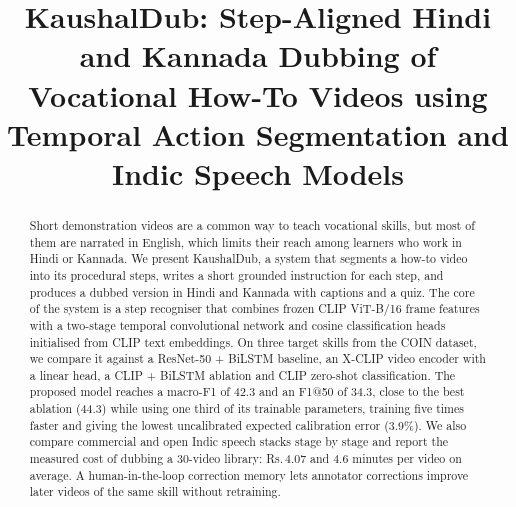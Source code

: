 \documentclass[conference]{IEEEtran}
\newcommand{\rup}{Rs.\,}
\begin{document}
\title{KaushalDub: Step-Aligned Hindi and Kannada Dubbing of Vocational How-To Videos using Temporal Action Segmentation and Indic Speech Models}

\author{
\and
{}
\and
{}
}

\maketitle

\begin{abstract}
Short demonstration videos are a common way to teach vocational skills, but most of them are narrated in English, which
limits their reach among learners who work in Hindi or Kannada. We present KaushalDub, a system that segments a how-to
video into its procedural steps, writes a short grounded instruction for each step, and produces a dubbed version in Hindi
and Kannada with captions and a quiz. The core of the system is a step recogniser that combines frozen CLIP ViT-B/16
frame features with a two-stage temporal convolutional network and cosine classification heads initialised from CLIP
text embeddings. On three target skills from the COIN dataset, we compare it against a ResNet-50 + BiLSTM baseline, an
X-CLIP video encoder with a linear head, a CLIP + BiLSTM ablation and CLIP zero-shot classification. The proposed model
reaches a macro-F1 of 42.3 and an F1@50 of 34.3, close to the best ablation (44.3) while using one third of its trainable
parameters, training five times faster and giving the lowest uncalibrated expected calibration error (3.9\%). We also
compare commercial and open Indic speech stacks stage by stage and report the measured cost of dubbing a 30-video
library: \rup4.07 and 4.6 minutes per video on average. A human-in-the-loop correction memory lets annotator
corrections improve later videos of the same skill without retraining.
\end{abstract}
\end{document}
